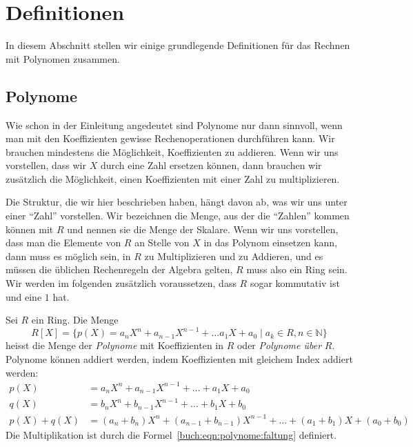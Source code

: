 %
%
%
\section{Definitionen
\label{buch:section:polynome:definitionen}}
In diesem Abschnitt stellen wir einige grundlegende Definitionen für das
Rechnen mit Polynomen zusammen.

%
%
\subsection{Polynome
\label{buch:subsection:polynome:polynome}}
Wie schon in der Einleitung angedeutet sind Polynome nur dann sinnvoll,
wenn man mit den Koeffizienten gewisse Rechenoperationen durchführen kann.
Wir brauchen mindestens die Möglichkeit, Koeffizienten zu addieren.
Wenn wir uns vorstellen, dass wir $X$ durch eine Zahl ersetzen können,
dann brauchen wir zusätzlich die Möglichkeit, einen Koeffizienten mit einer
Zahl zu multiplizieren.

Die Struktur, die wir hier beschrieben haben, hängt davon ab, was wir uns
unter einer ``Zahl'' vorstellen.
Wir bezeichnen die Menge, aus der die ``Zahlen'' kommen können mit $R$ und
nennen sie die Menge der Skalare.
%
Wenn wir uns vorstellen, dass man die Elemente von $R$ an Stelle von $X$
in das Polynom einsetzen kann, dann muss es möglich sein, in $R$ zu
Multiplizieren und zu Addieren, und es müssen die üblichen Rechenregeln
der Algebra gelten, $R$ muss also ein Ring sein.
%
Wir werden im folgenden zusätzlich voraussetzen, dass $R$ sogar kommutativ
ist und eine $1$ hat.

\begin{definition}
Sei $R$ ein Ring.
Die Menge
\[
R[X]
=
\{
p(X) = a_nX^n+a_{n-1}X^{n-1} + \dots a_1X+a_0 \mid a_k\in R, n\in\mathbb{N}
\}
\]
heisst die Menge der {\em Polynome} mit Koeffizienten in $R$
oder
{\em Polynome über} $R$.
%
Polynome können addiert werden, indem Koeffizienten mit gleichem Index
addiert werden:
\begin{align*}
p(X) &= a_nX^n + a_{n-1}X^{n-1} + \dots + a_1X + a_0\\
q(X) &= b_nX^n + b_{n-1}X^{n-1} + \dots + b_1X + b_0\\
p(X)+q(X)
&=
(a_n+b_n)X^n
+
(a_{n-1}+b_{n-1})X^{n-1}
+
\dots
+
(a_1+b_1)X
+
(a_0+b_0)
\end{align*}
Die Multiplikation ist durch die Formel~\eqref{buch:eqn:polynome:faltung}
definiert.
\end{definition}

